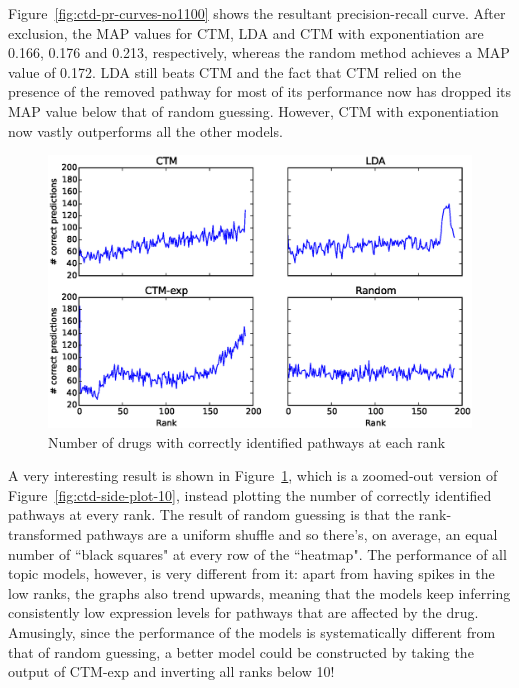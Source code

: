 \documentclass[12pt,a4paper,twoside,openright]{report}
\begin{document}
Figure~\ref{fig:ctd-pr-curves-no1100} shows the resultant precision-recall curve. After exclusion, the MAP values for CTM, LDA and CTM with exponentiation are 0.166, 0.176 and 0.213, respectively, whereas the random method achieves a MAP value of 0.172. LDA still beats CTM and the fact that CTM relied on the presence of the removed pathway for most of its performance now has dropped its MAP value below that of random guessing. However, CTM with exponentiation now vastly outperforms all the other models.

\begin{figure}[!htb]
\includegraphics[width=\textwidth]{ctd-side-plots.eps}
\caption{Number of drugs with correctly identified pathways at each rank}
\label{fig:ctd-side-plots}
\end{figure}

A very interesting result is shown in Figure~\ref{fig:ctd-side-plots}, which is a zoomed-out version of Figure~\ref{fig:ctd-side-plot-10}, instead plotting the number of correctly identified pathways at every rank. The result of random guessing is that the rank-transformed pathways are a uniform shuffle and so there's, on average, an equal number of ``black squares" at every row of the ``heatmap". The performance of all topic models, however, is very different from it: apart from having spikes in the low ranks, the graphs also trend upwards, meaning that the models keep inferring consistently low expression levels for pathways that are affected by the drug. Amusingly, since the performance of the models is systematically different from that of random guessing, a better model could be constructed by taking the output of CTM-exp and inverting all ranks below 10!
\end{document}
